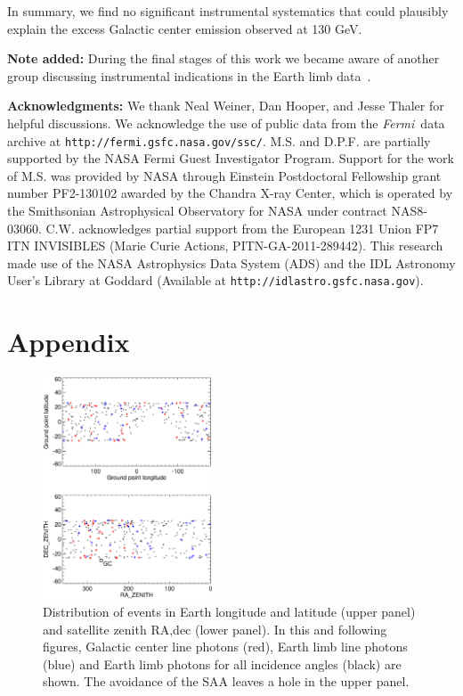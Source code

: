 \documentclass[aps,twocolumn,prd,superscriptaddress,showpacs,nofootinbib,fixfloat]{revtex4}
\newcommand{\Fermi}{{\slshape Fermi}}
\begin{document}
In summary, we find no significant instrumental systematics that could
plausibly explain the excess Galactic center emission observed at 130 GeV. 

\vskip 0.15in {\bf \noindent Note added:} During the final stages of this
work we became aware of another group discussing instrumental indications in
the Earth limb data~\cite{TempelSoon}.

\vskip 0.15in {\bf \noindent Acknowledgments:} We thank Neal
Weiner, Dan Hooper, and Jesse Thaler for helpful discussions. We acknowledge the use of
public data from the \Fermi\ data archive at
\texttt{http://fermi.gsfc.nasa.gov/ssc/}.  M.S. and
D.P.F. are partially supported by the NASA Fermi Guest
Investigator Program. Support for the work of M.S. was
provided by NASA through Einstein Postdoctoral Fellowship
grant number PF2-130102 awarded by the Chandra X-ray Center,
which is operated by the Smithsonian Astrophysical
Observatory for NASA under contract
NAS8-03060. C.W. acknowledges partial support from the
European 1231 Union FP7 ITN INVISIBLES (Marie Curie Actions,
PITN-GA-2011-289442).  This research made use of the NASA
Astrophysics Data System (ADS) and the IDL Astronomy User's
Library at Goddard (Available at
\texttt{http://idlastro.gsfc.nasa.gov}).

\section{Appendix}

\begin{figure}
  \centering
  \includegraphics[width=0.45\textwidth]{plots/geo-lonlat.ps}
  \caption{Distribution of events in Earth
  longitude and latitude (upper panel) and satellite zenith
  RA,dec (lower panel).  In this and following figures, Galactic center line photons (red), Earth limb line
  photons (blue) and Earth limb photons for all incidence angles (black) are
  shown.  The avoidance of the SAA leaves a
  hole in the upper panel.}
  \label{fig:geo-lonlat}
\end{figure}
\end{document}
